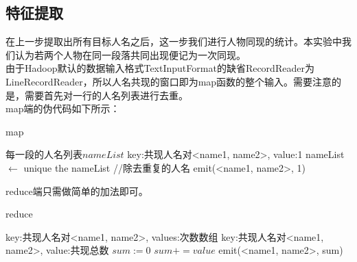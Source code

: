 \subsection{特征提取}
在上一步提取出所有目标人名之后，这一步我们进行人物同现的统计。本实验中我们认为若两个人物在同一段落共同出现便记为一次同现。\\
\indent 由于Hadoop默认的数据输入格式TextInputFormat的缺省RecordReader为LineRecordReader，所以人名共现的窗口即为map函数的整个输入。需要注意的是，需要首先对一行的人名列表进行去重。\\
map端的伪代码如下所示：
\begin{algorithm}[H]
	\caption{map}
	\begin{algorithmic}[1]
		\REQUIRE 每一段的人名列表$nameList$
		\ENSURE key:共现人名对<name1, name2>, value:1
		\STATE nameList $\leftarrow$ unique the nameList //除去重复的人名
					\STATE emit(<name1, name2>, 1)
				\ENDIF
			\ENDFOR
		\ENDFOR
	\end{algorithmic}
\end{algorithm}
reduce端只需做简单的加法即可。
\begin{algorithm}[H]
	\caption{reduce}
	\begin{algorithmic}[1]
		\REQUIRE key:共现人名对<name1, name2>, values:次数数组
		\ENSURE key:共现人名对<name1, name2>, value:共现总数
		\STATE $sum:=0$
			\STATE $sum += value$
		\ENDFOR
		\STATE emit(<name1, name2>, sum)
	\end{algorithmic}
\end{algorithm}